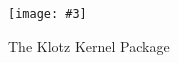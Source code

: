 \documentclass{sig-alternate}
\newcommand{\fig}[4]{
	\begin{figure}[#1]
		\centering
		\texttt{[image: \#3]}
		\caption{\label{fig:#3}#4}
	\end{figure}}
\newcommand{\seclabel}[1]{\label{sec:#1}}
\begin{document}
\fig{h}{0.4}{scatterplotLayout}{The Klotz Kernel Package}


%
%
%
% 
%
\end{document}
